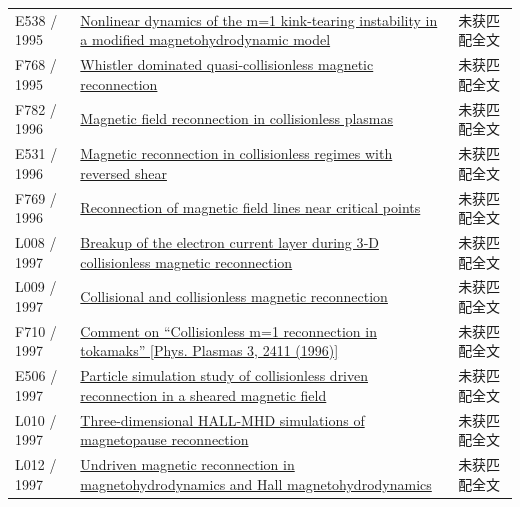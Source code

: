\begin{longtable}{P{24mm}P{97mm}P{27mm}}
E538 / 1995 & \href{https://doi.org/10.1063/1.871088}{Nonlinear dynamics of the m=1 kink-tearing instability in a modified magnetohydrodynamic model} & 未获匹配全文\\

F768 / 1995 & \href{http://hdl.handle.net/10068/262417}{Whistler dominated quasi-collisionless magnetic reconnection} & 未获匹配全文\\

F782 / 1996 & \href{http://www.osti.gov/scitech/biblio/489441-magnetic-field-reconnection-collisionless-plasmas}{Magnetic field reconnection in collisionless plasmas} & 未获匹配全文\\

E531 / 1996 & \href{http://www.osti.gov/scitech/biblio/489565-magnetic-reconnection-collisionless-regimes-reversed-shear}{Magnetic reconnection in collisionless regimes with reversed shear} & 未获匹配全文\\

F769 / 1996 & \href{http://hdl.handle.net/11568/54239}{Reconnection of magnetic field lines near critical points} & 未获匹配全文\\

L008 / 1997 & \href{https://doi.org/10.1029/97gl52961}{Breakup of the electron current layer during 3‐D collisionless magnetic reconnection} & 未获匹配全文\\

L009 / 1997 & \href{https://doi.org/10.1063/1.872338}{Collisional and collisionless magnetic reconnection} & 未获匹配全文\\

F710 / 1997 & \href{https://doi.org/10.1063/1.872215}{Comment on “Collisionless m=1 reconnection in tokamaks” [Phys. Plasmas 3,  2411 (1996)]} & 未获匹配全文\\

E506 / 1997 & \href{https://doi.org/10.1063/1.872088}{Particle simulation study of collisionless driven reconnection in a sheared magnetic field} & 未获匹配全文\\

L010 / 1997 & \href{https://doi.org/10.1016/s0079-1946(97)00206-1}{Three-dimensional HALL-MHD simulations of magnetopause reconnection} & 未获匹配全文\\

L012 / 1997 & \href{https://doi.org/10.1029/96ja03634}{Undriven magnetic reconnection in magnetohydrodynamics and Hall magnetohydrodynamics} & 未获匹配全文\\


\end{longtable}
